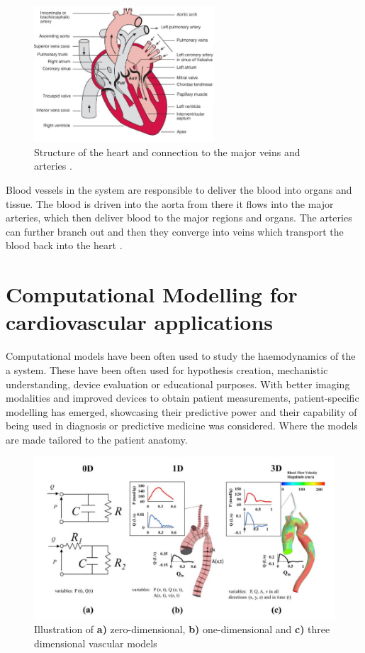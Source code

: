 \begin{figure}[ht!]
  \centering
  \includegraphics[width=0.6\textwidth]{Figures/heart.PNG}
  \caption{Structure of the heart and connection to the major veins and arteries \cite{Levick2010Introduction5ed}.}
  \label{fig:heart}
\end{figure}


Blood vessels in the system are responsible to deliver the blood into organs and tissue. The blood is driven into the aorta from there it flows into the major arteries, which then deliver blood to the major regions and organs. The arteries can further branch out and then they converge into veins which transport the blood back into the heart \cite{Levick2010Introduction5ed}.\par

\section{Computational Modelling for cardiovascular applications}
Computational models have been often used to study the haemodynamics of the a system. These have been often used for hypothesis creation, mechanistic understanding, device evaluation or educational purposes. With better imaging modalities and improved devices to obtain patient measurements, patient-specific modelling has emerged, showcasing their predictive power and their capability of being used in diagnosis or predictive medicine was considered. Where the models are made tailored to the patient anatomy.\par
\begin{figure}
    \centering
    \includegraphics[width=\textwidth]{Figures/CardioMod.JPG}
    \caption{Illustration of \textbf{a)} zero-dimensional, \textbf{b)} one-dimensional and \textbf{c)} three dimensional vascular models \cite{Hose2019CardiovascularNext}}
    \label{fig:CardioMod}
\end{figure}

